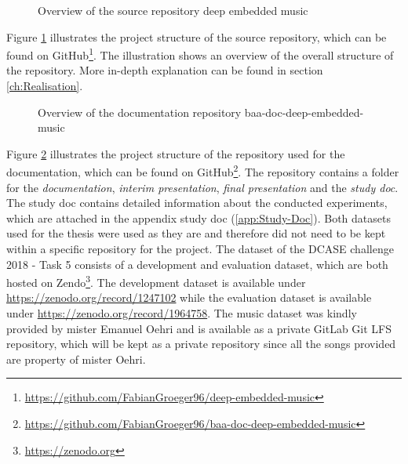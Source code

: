 \begin{figure}[ht]
\caption{Overview of the source repository \flqq deep embedded music\frqq}
\label{fig:Project-Overview-Source}
\end{figure}
\noindent
Figure \ref{fig:Project-Overview-Source} illustrates the project structure of the source repository, which can be found on GitHub\footnote{\url{https://github.com/FabianGroeger96/deep-embedded-music}}. The illustration shows an overview of the overall structure of the repository. More in-depth explanation can be found in section \ref{ch:Realisation}.

\begin{figure}[ht]
\caption{Overview of the documentation repository \flqq baa-doc-deep-embedded-music\frqq}
\label{fig:Project-Overview-Documentation}
\end{figure}
\noindent
Figure \ref{fig:Project-Overview-Documentation} illustrates the project structure of the repository used for the documentation, which can be found on GitHub\footnote{\url{https://github.com/FabianGroeger96/baa-doc-deep-embedded-music}}. The repository contains a folder for the \textit{documentation}, \textit{interim presentation}, \textit{final presentation} and the \textit{study doc}. The study doc contains detailed information about the conducted experiments, which are attached in the appendix study doc (\ref{app:Study-Doc}).
\newline
\newline
Both datasets used for the thesis were used as they are and therefore did not need to be kept within a specific repository for the project. The dataset of the DCASE challenge 2018 - Task 5 consists of a development and evaluation dataset, which are both hosted on Zendo\footnote{\url{https://zenodo.org}}. The development dataset is available under \url{https://zenodo.org/record/1247102} while the evaluation dataset is available under \url{https://zenodo.org/record/1964758}. 
\newline
\newline
The music dataset was kindly provided by mister Emanuel Oehri and is available as a private GitLab Git LFS repository, which will be kept as a private repository since all the songs provided are property of mister Oehri.

